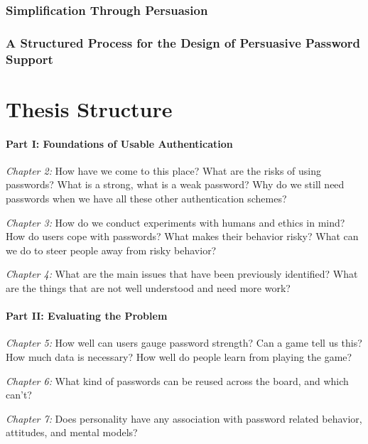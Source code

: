 \subsubsection{Simplification Through Persuasion}

\subsubsection{A Structured Process for the Design of Persuasive Password Support}



\section{Thesis Structure}
\paragraph{Part I: Foundations of Usable Authentication}

\textit{Chapter 2:} %
How have we come to this place?
What are the risks of using passwords?
What is a strong, what is a weak password?
Why do we still need passwords when we have all these other authentication schemes?

\textit{Chapter 3:} %
How do we conduct experiments with humans and ethics in mind?
How do users cope with passwords? What makes their behavior risky?
What can we do to steer people away from risky behavior? 

\textit{Chapter 4:} 
What are the main issues that have been previously identified?
What are the things that are not well understood and need more work?


\paragraph{Part II: Evaluating the Problem}
\textit{Chapter 5:} %
How well can users gauge password strength?
Can a game tell us this?
How much data is necessary?
How well do people learn from playing the game?

\textit{Chapter 6:} %
What kind of passwords can be reused across the board, and which can't?

\textit{Chapter 7:} %
Does personality have any association with password related behavior, attitudes, and mental models?

